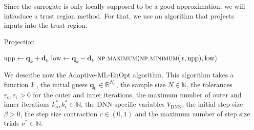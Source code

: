  Since the surrogate is only locally supposed to be a good approximation, we will introduce a trust region method. For that, we use an algorithm that projects inputs into the trust region.
 
 \begin{algorithm}[H]%
\caption{\label{projectionAlg}Projection}
\begin{algorithmic}[1]
\State $\mathrm{upp}\gets\mathbf{q}_k+\mathbf{d}_k$
\State $\mathrm{low}\gets\mathbf{q}_k-\mathbf{d}_k$
\State \Return $\Call{np.maximum}{\protect\Call{np.minimum}{x,\mathrm{upp}},\mathrm{low}}$
\EndFunction
\end{algorithmic}
\end{algorithm}

We describe now the Adaptive-ML-EnOpt algorithm. This algorithm takes a function $\textproc{F}$, the initial guess $\mathbf{q}_0\in\mathbb{R}^{N_\mathbf{q}}$, the sample size $N\in\mathbb{N}$, the tolerances $\varepsilon_o,\varepsilon_i>0$ for the outer and inner iterations, the maximum number of outer and inner iterations $k_o^*,k_i^*\in\mathbb{N}$, the DNN-specific variables $V_{\mathrm{DNN}}$, the initial step size $\beta>0$, the step size contraction $r\in(0,1)$ and the maximum number of step size trials $\nu^*\in\mathbb{N}$.
